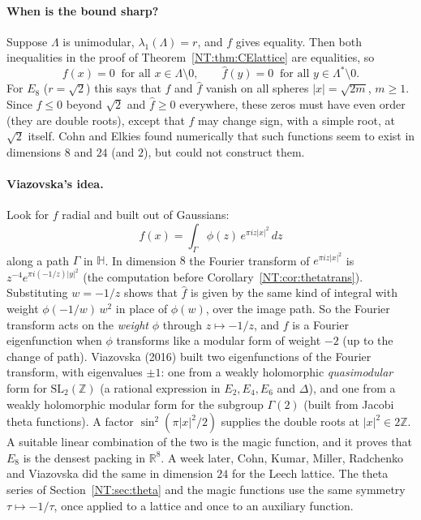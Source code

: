 \documentclass[11pt,openany]{book}
\theoremstyle{plain}
\theoremstyle{definition}
\theoremstyle{remark}
\newcommand{\R}{\mathbb{R}}
\newcommand{\Z}{\mathbb{Z}}
\newcommand{\Lat}{\Lambda}             %
\newcommand{\SL}{\mathrm{SL}}
\newcommand{\abs}[1]{\left\lvert #1 \right\rvert}
\begin{document}
\paragraph{When is the bound sharp?} Suppose $\Lat$ is unimodular, $\lambda_1(\Lat)=r$, and $f$ gives
equality. Then both inequalities in the proof of Theorem~\ref{NT:thm:CElattice} are equalities, so
\[
  f(x)=0\ \text{ for all }x\in\Lat\setminus0,\qquad \hat f(y)=0\ \text{ for all }y\in\Lat^*\setminus0.
\]
For $E_8$ ($r=\sqrt2$) this says that $f$ and $\hat f$ vanish on all spheres $\abs x=\sqrt{2m}$, $m\ge1$. Since
$f\le0$ beyond $\sqrt2$ and $\hat f\ge0$ everywhere, these zeros must have even order (they are double roots),
except that $f$ may change sign, with a simple root, at $\sqrt2$ itself.
Cohn and Elkies found numerically that such functions seem to exist in dimensions $8$ and $24$ (and
$2$), but could not construct them.

\paragraph{Viazovska's idea.} Look for $f$ radial and built out of Gaussians:
\[
  f(x)=\int_{\Gamma}\phi(z)\,e^{\pi iz\abs x^2}\,dz
\]
along a path $\Gamma$ in $\mathbb H$. In dimension $8$ the Fourier transform of $e^{\pi iz\abs x^2}$ is
$z^{-4}e^{\pi i(-1/z)\abs y^2}$ (the computation before Corollary~\ref{NT:cor:thetatrans}). Substituting
$w=-1/z$ shows that $\hat f$ is given by the same kind of integral with weight $\phi(-1/w)\,w^{2}$ in place of
$\phi(w)$, over the image path. So the Fourier transform acts on the \emph{weight} $\phi$ through
$z\mapsto-1/z$, and $f$ is a Fourier eigenfunction when $\phi$ transforms like a modular form of weight $-2$
(up to the change of path). Viazovska (2016) built two eigenfunctions of the Fourier transform, with
eigenvalues $\pm1$: one from a weakly holomorphic \emph{quasimodular} form for $\SL_2(\Z)$ (a rational
expression in $E_2,E_4,E_6$ and $\Delta$), and one from a weakly holomorphic modular form for the subgroup
$\Gamma(2)$ (built from Jacobi theta functions). A factor $\sin^2(\pi\abs x^2/2)$ supplies the
double roots at $\abs x^2\in2\Z$. A suitable linear combination of the two is the magic function, and it proves that $E_8$ is the densest
packing in $\R^8$. A week later, Cohn, Kumar, Miller, Radchenko and Viazovska did the same in dimension
$24$ for the Leech lattice. The theta series of Section~\ref{NT:sec:theta} and the magic functions use
the same symmetry $\tau\mapsto-1/\tau$, once applied to a lattice and once to an auxiliary function.
\end{document}

